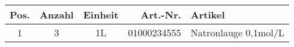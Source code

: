 \begin{longtable}{cccrX}
Pos. & Anzahl & Einheit & Art.-Nr. & Artikel\\
\endhead
\hline

1 & 3 & 1L & 01000234555 & Natronlauge 0,1mol/L\\

\end{longtable}